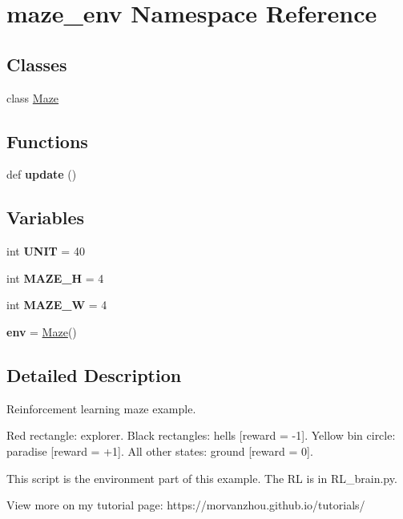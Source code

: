 \hypertarget{namespacemaze__env}{}\section{maze\+\_\+env Namespace Reference}
\label{namespacemaze__env}
\subsection*{Classes}
\begin{DoxyCompactItemize}
\item 
class \mbox{\hyperlink{classmaze__env_1_1Maze}{Maze}}
\end{DoxyCompactItemize}
\subsection*{Functions}
\begin{DoxyCompactItemize}
\item 
\mbox{\label{namespacemaze__env_a16f876be9de62d44b2329c3d8c104aa4}} 
def {\bfseries update} ()
\end{DoxyCompactItemize}
\subsection*{Variables}
\begin{DoxyCompactItemize}
\item 
\mbox{\label{namespacemaze__env_ad2686d8f78eb11c273ff94d1530dd7c2}} 
int {\bfseries U\+N\+IT} = 40
\item 
\mbox{\label{namespacemaze__env_af22ac7b911e168f32b3fe882fa6ce0ea}} 
int {\bfseries M\+A\+Z\+E\+\_\+H} = 4
\item 
\mbox{\label{namespacemaze__env_a6257e3c5423039a173e7bd3a22ecbb2e}} 
int {\bfseries M\+A\+Z\+E\+\_\+W} = 4
\item 
\mbox{\label{namespacemaze__env_abc041f52cdfff980381eb2f580a1460e}} 
{\bfseries env} = \mbox{\hyperlink{classmaze__env_1_1Maze}{Maze}}()
\end{DoxyCompactItemize}


\subsection{Detailed Description}
\begin{DoxyVerb}Reinforcement learning maze example.

Red rectangle:          explorer.
Black rectangles:       hells       [reward = -1].
Yellow bin circle:      paradise    [reward = +1].
All other states:       ground      [reward = 0].

This script is the environment part of this example. The RL is in RL_brain.py.

View more on my tutorial page: https://morvanzhou.github.io/tutorials/
\end{DoxyVerb}
 
